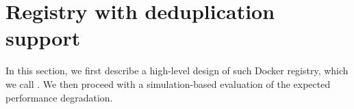 \section{Registry with deduplication support}
\label{sec:file_adressable}

%
In this section, we first describe a high-level design of such Docker registry,
which we call \emph{\sysname}.
%
We then proceed with a simulation-based evaluation of the expected performance
degradation.






